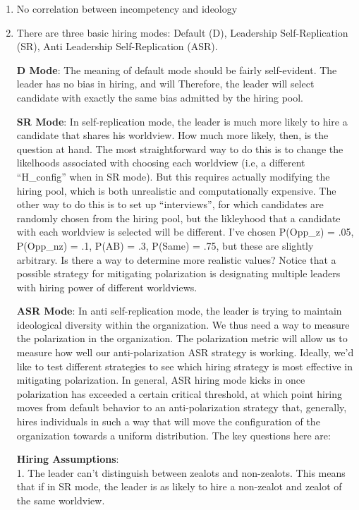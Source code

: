 \documentclass[]{article}
\begin{document}
\begin{enumerate}
\def\labelenumi{\arabic{enumi}.}
\item
  No correlation between incompetency and ideology
\item
  There are three basic hiring modes: Default (D), Leadership
  Self-Replication (SR), Anti Leadership Self-Replication (ASR).

  \textbf{D Mode}: The meaning of default mode should be fairly
  self-evident. The leader has no bias in hiring, and will Therefore,
  the leader will select candidate with exactly the same bias admitted
  by the hiring pool.

  \textbf{SR Mode}: In self-replication mode, the leader is much more
  likely to hire a candidate that shares his worldview. How much more
  likely, then, is the question at hand. The most straightforward way to
  do this is to change the likelhoods associated with choosing each
  worldview (i.e, a different ``H\_config'' when in SR mode). But this
  requires actually modifying the hiring pool, which is both unrealistic
  and computationally expensive. The other way to do this is to set up
  ``interviews'', for which candidates are randomly chosen from the
  hiring pool, but the likleyhood that a candidate with each worldview
  is selected will be different. I've chosen P(Opp\_z) = .05, P(Opp\_nz)
  = .1, P(AB) = .3, P(Same) = .75, but these are slightly arbitrary. Is
  there a way to determine more realistic values? Notice that a possible
  strategy for mitigating polarization is designating multiple leaders
  with hiring power of different worldviews.

  \textbf{ASR Mode}: In anti self-replication mode, the leader is trying
  to maintain ideological diversity within the organization. We thus
  need a way to measure the polarization in the organization. The
  polarization metric will allow us to measure how well our
  anti-polarization ASR strategy is working. Ideally, we'd like to test
  different strategies to see which hiring strategy is most effective in
  mitigating polarization. In general, ASR hiring mode kicks in once
  polarization has exceeded a certain critical threshold, at which point
  hiring moves from default behavior to an anti-polarization strategy
  that, generally, hires individuals in such a way that will move the
  configuration of the organization towards a uniform distribution. The
  key questions here are:

  \textbf{Hiring Assumptions}:\\
  1. The leader can't distinguish between zealots and non-zealots. This
  means that if in SR mode, the leader is as likely to hire a non-zealot
  and zealot of the same worldview.


\end{enumerate}
\end{document}
